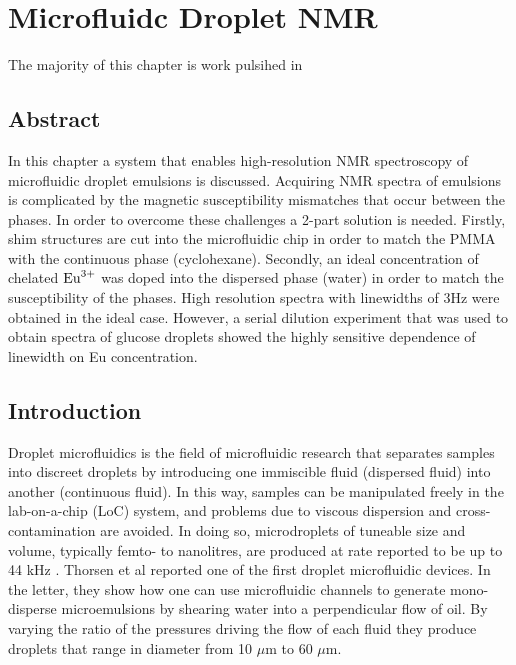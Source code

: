 
\chapter{Microfluidc Droplet NMR}

The majority of this chapter is work pulsihed in \citep{Hale:2018fv}

\section{Abstract}

In this chapter a system that enables high-resolution NMR spectroscopy of microfluidic droplet
emulsions is discussed. Acquiring NMR spectra of emulsions is complicated by the magnetic
susceptibility mismatches that occur between the phases. In order to overcome these challenges a
2-part solution is needed. Firstly, shim structures are cut into the microfluidic chip in order
to match the PMMA with the continuous phase (cyclohexane). Secondly, an ideal concentration of
chelated $\ce{Eu^{3+}}$ was doped into the dispersed phase (water) in order to match the susceptibility of
the phases. High resolution spectra with linewidths of 3Hz were obtained in the ideal case.
However, a serial dilution experiment that was used to obtain spectra of glucose droplets showed
the highly sensitive dependence of linewidth on Eu concentration.

\section{Introduction}

Droplet microfluidics is the field of microfluidic research that separates samples into discreet droplets by introducing one
immiscible fluid (dispersed fluid) into another (continuous fluid). In this way, samples can be manipulated freely in the lab-on-a-chip (LoC) system,
and problems due to viscous dispersion and cross-contamination
are avoided. In doing so, microdroplets of tuneable size and volume,
typically femto- to nanolitres, are produced at rate reported to be up to 44 kHz \citep{RN115}. Thorsen et al\citep{RN104}
reported one of the first droplet microfluidic devices. In the letter, they show how one can use microfluidic channels to
generate mono-disperse microemulsions by shearing water into a perpendicular flow of oil. By varying the ratio of the pressures
driving the flow of each fluid they produce droplets that range in diameter from 10 $\mu\text{m}$ to 60 $\mu\text{m}$.

